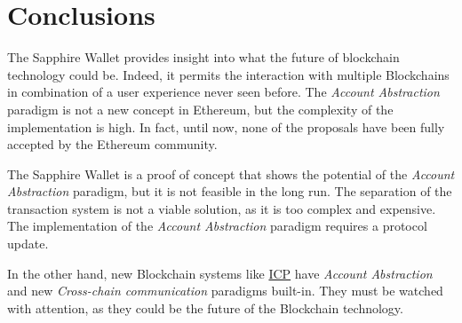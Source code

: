 \chapter{Conclusions}
\label{sec:conclusions}

The Sapphire Wallet provides insight into what the future of blockchain technology could be. Indeed, it permits the interaction with multiple Blockchains in combination of a user experience never seen before. The \textit{Account Abstraction} paradigm is not a new concept in Ethereum, but the complexity of the implementation is high. In fact, until now, none of the proposals have been fully accepted by the Ethereum community. 

The Sapphire Wallet is a proof of concept that shows the potential of the \textit{Account Abstraction} paradigm, but it is not feasible in the long run. The separation of the transaction system is not a viable solution, as it is too complex and expensive. The implementation of the \textit{Account Abstraction} paradigm requires a protocol update.


In the other hand, new Blockchain systems like \hyperref[sec:icp]{ICP} have \textit{Account Abstraction} and new \textit{Cross-chain communication} paradigms built-in. They must be watched with attention, as they could be the future of the Blockchain technology.